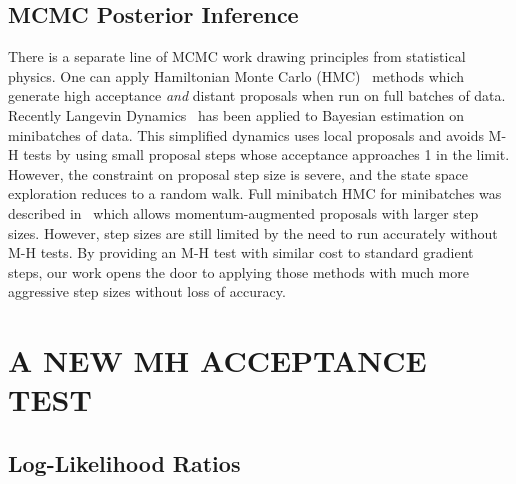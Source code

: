 \documentclass[twoside]{article} \usepackage{aistats2017}
\begin{document}
\subsection{MCMC Posterior Inference}
There is a separate line of MCMC work drawing principles from statistical
physics. One can apply
Hamiltonian Monte Carlo (HMC)~\citep{mcmc_hamiltonian_2010} methods which
generate high acceptance \emph{and} distant proposals when run on full batches
of data. Recently Langevin Dynamics~\citep{langevin_2011,conf/icml/AhnBW12} has
been applied to Bayesian estimation on minibatches of data. This simplified
dynamics uses local proposals and avoids M-H tests by using small proposal steps
whose acceptance approaches 1 in the limit. However, the constraint on proposal
step size is severe, and the state space exploration reduces to a random walk.
Full minibatch HMC for minibatches was described in~\citet{sghmc_2014} which
allows momentum-augmented proposals with larger step sizes. However, step sizes
are still limited by the need to run accurately without M-H tests.  By providing
an M-H test with similar cost to standard gradient steps, our work opens the
door to applying those methods with much more aggressive step sizes without loss
of accuracy. 




\section{A NEW MH ACCEPTANCE TEST}\label{sec:our_algorithm}

\subsection{Log-Likelihood Ratios}\label{ssec:log_likelihood_ratios}
\end{document}
